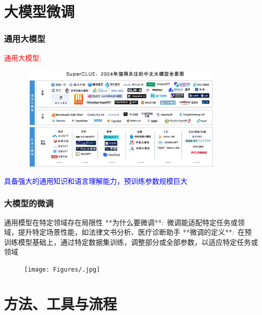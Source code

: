\small
\section{大模型微调}
\begin{frame}
    \frametitle{通用大模型}
    \textcolor{red}{通用大模型:}~{\fontsize{8.2pt}{6.2pt}}
\begin{figure}[h!]
\vspace*{-0.05in}
\centering
\includegraphics[height=2.0in, width=4.0in, viewport=0 0 1080 510,clip]{Figures/LLM_model-logo_Chinese.jpg}
\label{LLM_model-logo_Chinese}
\end{figure}
\textcolor{blue}{具备强大的通用知识和语言理解能力，预训练参数规模巨大}
\end{frame}

\begin{frame}
    \frametitle{大模型的微调}
通用模型在特定领域存在局限性
         **为什么要微调**:~微调能适配特定任务或领域，提升特定场景性能，如法律文书分析、医疗诊断助手
         **微调的定义**:~在预训练模型基础上，通过特定数据集训练，调整部分或全部参数，以适应特定任务或领域
\begin{figure}[h!]
\vspace*{-0.05in}
\centering
\texttt{[image: Figures/.jpg]}
\label{LLM_model-fine_tuning}
\end{figure}
\end{frame}

\section{方法、工具与流程}
